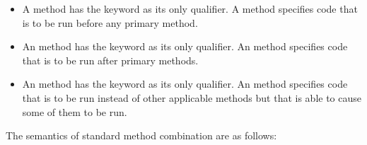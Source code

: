 \begin{itemize}
\item 
A  method has the keyword  as its
only qualifier.  A  method specifies code that is to be
run before any primary method.

\item 
An  method has the keyword  as its only
qualifier.  An  method specifies code that is to be run
after primary methods.  

\item 
An  method has the keyword  as its only
qualifier. An  method specifies code that is to
be run instead of other applicable methods but that is
able to cause some of them to be run.
\end{itemize}

The semantics of standard method combination are as follows:


